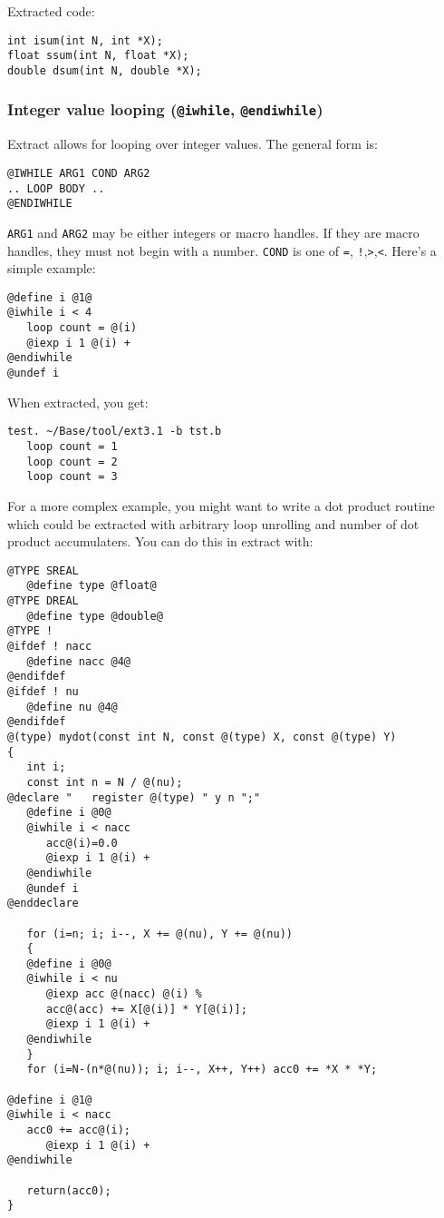 \noindent
Extracted code:
\begin{verbatim}
int isum(int N, int *X);
float ssum(int N, float *X);
double dsum(int N, double *X);
\end{verbatim}

\subsubsection{Integer value looping ({\tt @iwhile}, {\tt @endiwhile})}
\label{sec-iwhile}
Extract allows for looping over integer values.  The general form is:
\begin{verbatim}
@IWHILE ARG1 COND ARG2
.. LOOP BODY ..
@ENDIWHILE
\end{verbatim}

{\tt ARG1} and {\tt ARG2} may be either integers or macro handles.  If they
are macro handles, they must not begin with a number.  {\tt COND} is one of
\verb+=+, \verb+!+,\verb+>+,\verb+<+.
Here's a simple example:
\begin{verbatim}
@define i @1@
@iwhile i < 4
   loop count = @(i)
   @iexp i 1 @(i) +
@endiwhile
@undef i
\end{verbatim}

\noindent
When extracted, you get:
\begin{verbatim}
test. ~/Base/tool/ext3.1 -b tst.b
   loop count = 1
   loop count = 2
   loop count = 3
\end{verbatim}

For a more complex example, you might want to write a dot product routine
which could be extracted with arbitrary loop unrolling and number of dot
product accumulaters.  You can do this in extract with:
\begin{verbatim}
@TYPE SREAL
   @define type @float@
@TYPE DREAL
   @define type @double@
@TYPE !
@ifdef ! nacc
   @define nacc @4@
@endifdef
@ifdef ! nu
   @define nu @4@
@endifdef
@(type) mydot(const int N, const @(type) X, const @(type) Y)
{
   int i;
   const int n = N / @(nu);
@declare "   register @(type) " y n ";"
   @define i @0@
   @iwhile i < nacc
      acc@(i)=0.0
      @iexp i 1 @(i) +
   @endiwhile
   @undef i
@enddeclare

   for (i=n; i; i--, X += @(nu), Y += @(nu))
   {
   @define i @0@
   @iwhile i < nu
      @iexp acc @(nacc) @(i) %
      acc@(acc) += X[@(i)] * Y[@(i)];
      @iexp i 1 @(i) +
   @endiwhile
   }
   for (i=N-(n*@(nu)); i; i--, X++, Y++) acc0 += *X * *Y;

@define i @1@
@iwhile i < nacc
   acc0 += acc@(i);
      @iexp i 1 @(i) +
@endiwhile

   return(acc0);
}
\end{verbatim}

